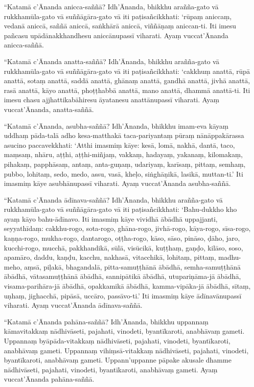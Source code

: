 “Katamā c’Ānanda anicca-saññā? Idh’Ānanda, bhikkhu arañña-gato vā
rukkhamūla-gato vā suññāgāra-gato vā iti paṭisañcikkhati: ‘rūpaṃ aniccaṃ, vedanā
aniccā, saññā aniccā, saṅkhārā aniccā, viññāṇaṃ aniccan-ti. Iti imesu pañcasu
upādānakkhandhesu aniccānupassī viharati. Ayaṃ vuccat’Ānanda anicca-saññā.

“Katamā c’Ānanda anatta-saññā? Idh’Ānanda, bhikkhu arañña-gato vā
rukkhamūla-gato vā suññāgāra-gato vā iti paṭisañcikkhati: ‘cakkhuṃ anattā, rūpā
anattā, sotaṃ anattā, saddā anattā, ghānaṃ anattā, gandhā anattā, jivhā anattā,
rasā anattā, kāyo anattā, phoṭṭhabbā anattā, mano anattā, dhammā anattā-ti. Iti
imesu chasu ajjhattikabāhiresu āyatanesu anattānupassī viharati. Ayaṃ
vuccat’Ānanda, anatta-saññā.

“Katamā c’Ānanda, asubha-saññā? Idh’Ānanda, bhikkhu imam-eva kāyaṃ uddhaṃ
pāda-talā adho kesa-matthakā taca-pariyantaṃ pūraṃ nānāppakārassa asucino
paccavekkhati: ‘Atthi imasmiṃ kāye: kesā, lomā, nakhā, dantā, taco, maṃsaṃ,
nhāru, aṭṭhi, aṭṭhi-miñjaṃ, vakkaṃ, hadayaṃ, yakanaṃ, kilomakaṃ, pihakaṃ,
papphāsaṃ, antaṃ, anta-guṇaṃ, udariyaṃ, karīsaṃ, pittaṃ, semhaṃ, pubbo, lohitaṃ,
sedo, medo, assu, vasā, kheḷo, siṅghāṇikā, lasikā, muttan-ti.’ Iti imasmiṃ kāye
asubhānupassī viharati. Ayaṃ vuccat’Ānanda asubha-saññā.

“Katamā c’Ānanda ādīnava-saññā? Idh’Ānanda, bhikkhu arañña-gato vā
rukkhamūla-gato vā suññāgāra-gato vā iti paṭisañcikkhati: ‘Bahu-dukkho kho ayaṃ
kāyo bahu-ādīnavo. Iti imasmiṃ kāye vividhā ābādhā uppajjanti, seyyathīdaṃ:
cakkhu-rogo, sota-rogo, ghāna-rogo, jivhā-rogo, kāya-rogo, sīsa-rogo,
kaṇṇa-rogo, mukha-rogo, dantarogo, oṭṭha-rogo, kāso, sāso, pināso, ḍāho, jaro,
kucchi-rogo, mucchā, pakkhandikā, sūlā, visūcikā, kuṭṭhaṃ, gaṇḍo, kilāso, soso,
apamāro, daddu, kaṇḍu, kacchu, nakhasā, vitacchikā, lohitaṃ, pittaṃ, madhu-meho,
aṃsā, piḷakā, bhagandalā, pitta-samuṭṭhānā ābādhā, semha-samuṭṭhānā ābādhā,
vātasamuṭṭhānā ābādhā, sannipātikā ābādhā, utupariṇāma-jā ābādhā,
visama-parihāra-jā ābādhā, opakkamikā ābādhā, kamma-vipāka-jā ābādhā, sītaṃ,
uṇhaṃ, jighacchā, pipāsā, uccāro, passāvo-ti.’ Iti imasmiṃ kāye ādīnavānupassī
viharati. Ayaṃ vuccat’Ānanda ādīnava-saññā.

“Katamā c’Ānanda pahāna-saññā? Idh’Ānanda, bhikkhu uppannaṃ kāmavitakkaṃ
nādhivāseti, pajahati, vinodeti, byantīkaroti, anabhāvaṃ gameti. Uppannaṃ
byāpāda-vitakkaṃ nādhivāseti, pajahati, vinodeti, byantīkaroti, anabhāvaṃ
gameti. Uppannaṃ vihiṃsā-vitakkaṃ nādhivāseti, pajahati, vinodeti, byantīkaroti,
anabhāvaṃ gameti. Uppann’uppanne pāpake akusale dhamme nādhivāseti, pajahati,
vinodeti, byantīkaroti, anabhāvaṃ gameti. Ayaṃ vuccat’Ānanda pahāna-saññā.

